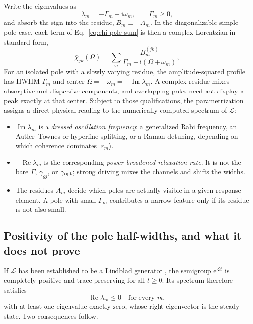 \documentclass[11pt,a4paper]{article}
\newcommand{\ii}{\mathrm i}
\newcommand{\e}{\mathrm e}
\newcommand{\Rea}{\operatorname{Re}}
\newcommand{\Ima}{\operatorname{Im}}
\newcommand{\chibar}{\bar\chi}
\newcommand{\ket}[1]{\lvert #1\rangle}
\begin{document}
Write the eigenvalues as
\begin{equation}
\lambda_m=-\Gamma_m+\ii\omega_m,\qquad \Gamma_m\geq0 ,
\label{eq:pole-parametrization}
\end{equation}
and absorb the sign into the residue, $B_m\equiv-A_m$. In the diagonalizable
simple-pole case, each term of
Eq.~\eqref{eq:chi-pole-sum} is then a complex Lorentzian in standard form,
\begin{equation}
\chibar_{jk}(\Omega)=\sum_m
\frac{B^{(jk)}_m}{\Gamma_m-\ii(\Omega+\omega_m)} ,
\label{eq:lorentzian-term}
\end{equation}
For an isolated pole with a slowly varying residue, the amplitude-squared
profile has HWHM $\Gamma_m$ and center
$\Omega=-\omega_m=-\Ima\lambda_m$. A complex residue mixes absorptive and
dispersive components, and overlapping poles need not display a peak exactly at
that center. Subject to those qualifications, the parametrization assigns a
direct physical reading to the numerically computed spectrum
of $\mathcal L$:
\begin{itemize}
\item $\Ima\lambda_m$ is a \emph{dressed oscillation frequency}: a
generalized Rabi frequency, an Autler--Townes or hyperfine splitting, or a
Raman detuning, depending on which coherence dominates $\ket{r_m}$.
\item $-\Rea\lambda_m$ is the corresponding \emph{power-broadened relaxation
rate}. It is not the bare $\Gamma$, $\gamma_{gg}$, or $\gamma_{\rm opt}$;
strong driving mixes the channels and shifts the widths.
\item The residues $A_m$ decide which poles are actually visible in a given
response element. A pole with small $\Gamma_m$ contributes a narrow feature
only if its residue is not also small.
\end{itemize}

\subsection{Positivity of the pole half-widths, and what it does not prove}
\label{sec:pole-positivity}

If $\mathcal L$ has been established to be a Lindblad generator \cite{GKS1976}, the semigroup $\e^{\mathcal Lt}$ is
completely positive and trace preserving for all $t\geq0$. Its spectrum
therefore satisfies
\begin{equation}
\Rea\lambda_m\leq0\quad\text{for every }m,
\label{eq:gksl-spectrum}
\end{equation}
with at least one eigenvalue exactly zero, whose right eigenvector is the
steady state. Two consequences follow.
\end{document}
